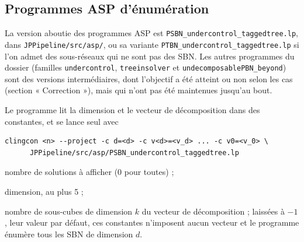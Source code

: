 \subsection{Programmes ASP d'énumération}
\label{ann:asp}


La version aboutie des programmes ASP est \texttt{PSBN\_undercontrol\_taggedtree.lp}, dans \texttt{JPPipeline/src/asp/}, ou sa variante \texttt{PTBN\_undercontrol\_taggedtree.lp} si l'on admet des sous-réseaux qui ne sont pas des SBN.
Les autres programmes du dossier (familles \texttt{undercontrol}, \texttt{treeinsolver} et \texttt{undecomposablePBN\_beyond}) sont des versions intermédiaires, dont l'objectif a été atteint ou non selon les cas (section « Correction »), mais qui n'ont pas été maintenues jusqu'au bout.

Le programme lit la dimension et le vecteur de décomposition dans des constantes, et se lance seul avec
{\small
\begin{verbatim}
clingcon <n> --project -c d=<d> -c v<d>=<v_d> ... -c v0=<v_0> \
      JPPipeline/src/asp/PSBN_undercontrol_taggedtree.lp
\end{verbatim}
}
\begin{description}
\setlength{\itemsep}{0pt}
\item[\texttt{<n>}] nombre de solutions à afficher (0 pour toutes) ;
\item[\texttt{d}] dimension, au plus 5 ;
\item[\texttt{v<k>}] nombre de sous-cubes de dimension $k$ du vecteur de décomposition ; laissées à $-1$, leur valeur par défaut, ces constantes n'imposent aucun vecteur et le programme énumère tous les SBN de dimension $d$.
\end{description}

